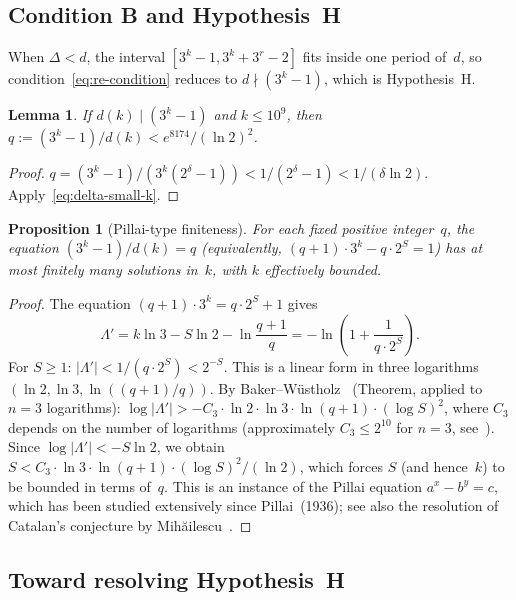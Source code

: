 \documentclass[11pt, a4paper]{amsart}
\theoremstyle{plain}
\newtheorem{proposition}[theorem]{Proposition}
\newtheorem{lemma}[theorem]{Lemma}
\theoremstyle{definition}
\theoremstyle{remark}
\begin{document}
\subsection{Condition B and Hypothesis~H}\label{ssec:condition-b}

When $\Delta < d$, the interval $[3^k-1, 3^k+3^r-2]$
fits inside one period of~$d$, so condition~\eqref{eq:re-condition}
reduces to $d \nmid (3^k - 1)$, which is Hypothesis~H.

\begin{lemma}\label{lem:q-bound}
  If $d(k) \mid (3^k - 1)$ and $k \leq 10^9$, then
  $q := (3^k - 1)/d(k) < e^{8174} / (\ln 2)^2$.
\end{lemma}

\begin{proof}
  $q = (3^k-1)/(3^k(2^\delta - 1)) < 1/(2^\delta - 1)
  < 1/(\delta \ln 2)$.  Apply~\eqref{eq:delta-small-k}.
\end{proof}

\begin{proposition}[Pillai-type finiteness]\label{prop:pillai}
  For each fixed positive integer~$q$, the equation
  $(3^k - 1)/d(k) = q$ (equivalently,
  $(q+1) \cdot 3^k - q \cdot 2^S = 1$)
  has at most finitely many solutions in~$k$, with
  $k$ effectively bounded.
\end{proposition}

\begin{proof}
  The equation $(q+1) \cdot 3^k = q \cdot 2^S + 1$ gives
  \[
    \Lambda' = k \ln 3 - S \ln 2 - \ln\!\frac{q+1}{q}
    = -\ln\!\left(1 + \frac{1}{q \cdot 2^S}\right).
  \]
  For $S \geq 1$: $|\Lambda'| < 1/(q \cdot 2^S) < 2^{-S}$.
  This is a linear form in three logarithms
  $(\ln 2, \ln 3, \ln((q+1)/q))$.
  By Baker--W\"ustholz~\cite{BakerWustholz1993} (Theorem,
  applied to $n = 3$ logarithms):
  $\log|\Lambda'| > -C_3 \cdot \ln 2 \cdot \ln 3 \cdot
  \ln(q+1) \cdot (\log S)^2$,
  where $C_3$ depends on the number of logarithms
  (approximately $C_3 \leq 2^{10}$ for $n = 3$,
  see~\cite{BakerWustholz1993}).
  Since $\log|\Lambda'| < -S \ln 2$, we obtain
  $S < C_3 \cdot \ln 3 \cdot \ln(q+1) \cdot (\log S)^2 / (\ln 2)$,
  which forces $S$ (and hence~$k$) to be bounded
  in terms of~$q$.
  This is an instance of the Pillai equation
  $a^x - b^y = c$, which has been studied extensively
  since Pillai~(1936); see also the resolution of
  Catalan's conjecture by Mih\u{a}ilescu~\cite{Mihailescu2004}.
\end{proof}

\subsection{Toward resolving Hypothesis~H}\label{ssec:closing-H}
\end{document}
